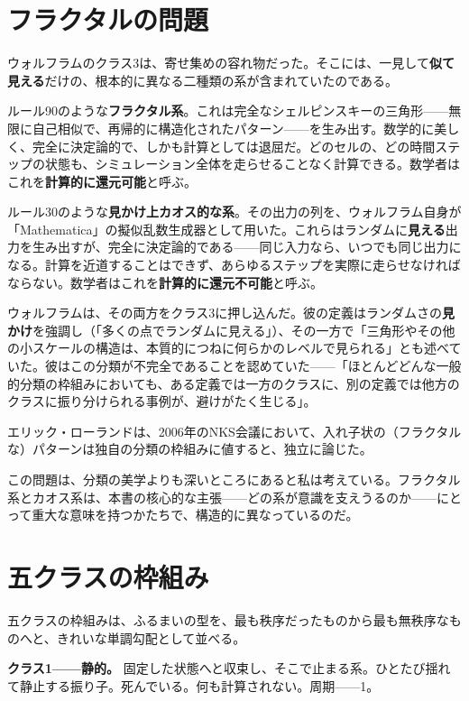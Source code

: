 \documentclass[11pt, twoside, openright]{book}
\begin{document}
\section*{フラクタルの問題}

ウォルフラムのクラス3は、寄せ集めの容れ物だった。そこには、一見して\textbf{似て見える}だけの、根本的に異なる二種類の系が含まれていたのである。

ルール90のような\textbf{フラクタル系}。これは完全なシェルピンスキーの三角形------無限に自己相似で、再帰的に構造化されたパターン------を生み出す。数学的に美しく、完全に決定論的で、しかも計算としては退屈だ。どのセルの、どの時間ステップの状態も、シミュレーション全体を走らせることなく計算できる。数学者はこれを\textbf{計算的に還元可能}と呼ぶ。

ルール30のような\textbf{見かけ上カオス的な系}。その出力の列を、ウォルフラム自身が「Mathematica」の擬似乱数生成器として用いた。これらはランダムに\textbf{見える}出力を生み出すが、完全に決定論的である------同じ入力なら、いつでも同じ出力になる。計算を近道することはできず、あらゆるステップを実際に走らせなければならない。数学者はこれを\textbf{計算的に還元不可能}と呼ぶ。

ウォルフラムは、その両方をクラス3に押し込んだ。彼の定義はランダムさの\textbf{見かけ}を強調し（「多くの点でランダムに見える」）、その一方で「三角形やその他の小スケールの構造は、本質的につねに何らかのレベルで見られる」とも述べていた。彼はこの分類が不完全であることを認めていた------「ほとんどどんな一般的分類の枠組みにおいても、ある定義では一方のクラスに、別の定義では他方のクラスに振り分けられる事例が、避けがたく生じる」。

エリック・ローランドは、2006年のNKS会議において、入れ子状の（フラクタルな）パターンは独自の分類の枠組みに値すると、独立に論じた。

この問題は、分類の美学よりも深いところにあると私は考えている。フラクタル系とカオス系は、本書の核心的な主張------どの系が意識を支えうるのか------にとって重大な意味を持つかたちで、構造的に異なっているのだ。

\section*{五クラスの枠組み}

五クラスの枠組みは、ふるまいの型を、最も秩序だったものから最も無秩序なものへと、きれいな単調勾配として並べる。

\textbf{クラス1------静的。} 固定した状態へと収束し、そこで止まる系。ひとたび揺れて静止する振り子。死んでいる。何も計算されない。周期------1。
\end{document}
